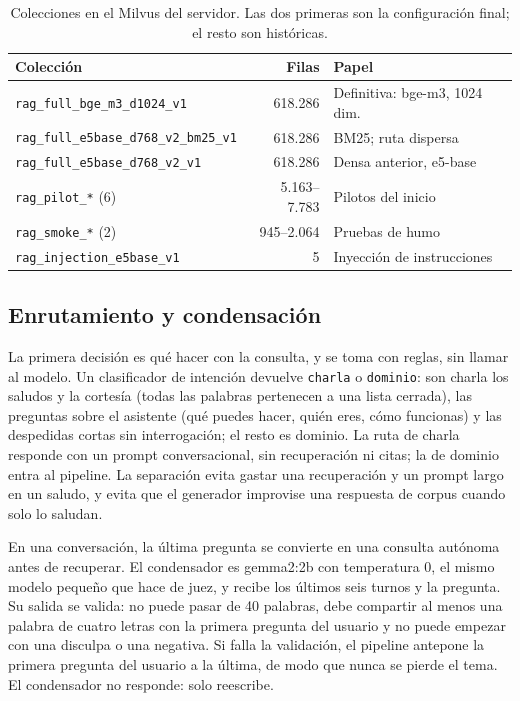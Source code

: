 \begin{table}[t]
\centering
\scriptsize
\setlength{\tabcolsep}{3pt}
\caption{Colecciones en el Milvus del servidor. Las dos primeras son la configuraci\'on final; el resto son hist\'oricas.}
\label{tab:colecciones-milvus}
\begin{tabular}{@{}p{4.2cm}rp{2.8cm}@{}}
\toprule
Colecci\'on & Filas & Papel \\
\midrule
\texttt{rag\_full\_bge\_m3\_\allowbreak d1024\_v1} & 618.286 & Definitiva: bge-m3, 1024 dim. \\
\texttt{rag\_full\_e5base\_d768\_v2\_\allowbreak bm25\_v1} & 618.286 & BM25; ruta dispersa \\
\texttt{rag\_full\_e5base\_d768\_v2\_v1} & 618.286 & Densa anterior, e5-base \\
\texttt{rag\_pilot\_*} (6) & 5.163--7.783 & Pilotos del inicio \\
\texttt{rag\_smoke\_*} (2) & 945--2.064 & Pruebas de humo \\
\texttt{rag\_injection\_e5base\_v1} & 5 & Inyecci\'on de instrucciones \\
\bottomrule
\end{tabular}
\end{table}

\subsection{Enrutamiento y condensaci\'on}
\label{sec:enrutamiento}

La primera decisi\'on es qu\'e hacer con la consulta, y se toma con reglas, sin llamar al modelo. Un clasificador de intenci\'on devuelve \texttt{charla} o \texttt{dominio}: son charla los saludos y la cortes\'ia (todas las palabras pertenecen a una lista cerrada), las preguntas sobre el asistente (qu\'e puedes hacer, qui\'en eres, c\'omo funcionas) y las despedidas cortas sin interrogaci\'on; el resto es dominio. La ruta de charla responde con un prompt conversacional, sin recuperaci\'on ni citas; la de dominio entra al pipeline. La separaci\'on evita gastar una recuperaci\'on y un prompt largo en un saludo, y evita que el generador improvise una respuesta de corpus cuando solo lo saludan.

En una conversaci\'on, la \'ultima pregunta se convierte en una consulta aut\'onoma antes de recuperar. El condensador es gemma2:2b con temperatura 0, el mismo modelo peque\~no que hace de juez, y recibe los \'ultimos seis turnos y la pregunta. Su salida se valida: no puede pasar de 40 palabras, debe compartir al menos una palabra de cuatro letras con la primera pregunta del usuario y no puede empezar con una disculpa o una negativa. Si falla la validaci\'on, el pipeline antepone la primera pregunta del usuario a la \'ultima, de modo que nunca se pierde el tema. El condensador no responde: solo reescribe.

